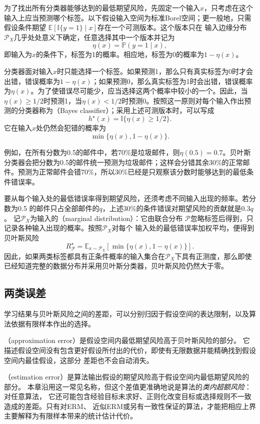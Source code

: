 为了找出所有分类器能够达到的最低期望风险，先固定一个输入$x$，只考虑在这个输入上应当预测哪个标签。以下假设输入空间为标准Borel空间；更一般地，只需假设条件期望
$\mathbb E[\mathbb I\{y=1\}\mid x]$存在一个可测版本。这个版本只在
输入边缘分布$\mathcal P_X$几乎处处意义下确定，任意选择其中一个版本并记为
\[
 \eta(x)=\mathbb P(y=1\mid x),
\]
即输入为$x$的条件下，标签为1的概率。相应地，标签为0的概率为$1-\eta(x)$。

分类器面对输入$x$时只能选择一个标签。如果预测1，那么只有真实标签为0时才会出错，错误概率为$1-\eta(x)$；如果预测0，那么真实标签为1时会出错，错误概率为$\eta(x)$。为了使错误尽可能少，应当选择这两个概率中较小的一个。因此，当$\eta(x)\geq1/2$时预测1，当$\eta(x)<1/2$时预测0。按照这一原则对每个输入作出预测的分类器称为（Bayes classifier）；采用上述可测版本时，可以写成
\[
 h^\star(x)=\mathbb I\{\eta(x)\geq1/2\}.
\]
它在输入$x$处仍然会犯错的概率为
\[
 \min\{\eta(x),1-\eta(x)\}.
\]

例如，在所有分数为0.5的邮件中，若70\%是垃圾邮件，则$\eta(0.5)=0.7$。贝叶斯分类器会把分数为0.5的邮件统一预测为垃圾邮件；这样会分错其余30\%的正常邮件。预测为正常邮件会错70\%，所以30\%已经是只观察该分数时能够达到的最低条件错误率。

要从每个输入处的最低错误率得到期望风险，还须考虑不同输入出现的频率。若分数为0.5
的邮件只占全部邮件的$q$，上述30\%的条件错误对期望风险的贡献就是$0.3q$。
记$\mathcal P_X$为输入的（marginal distribution）：它由联合分布
$\mathcal P$忽略标签后得到，只记录各种输入出现的概率。按照$\mathcal P_X$对每个
输入处的最低错误率加权平均，便得到贝叶斯风险
\[
 R_{\mathcal P}^\star=
 \mathbb E_{x\sim\mathcal P_X}[\min\{\eta(x),1-\eta(x)\}].
\]
因此，如果两类标签都具有正条件概率的输入集合在$\mathcal P_X$下具有正测度，那么即使
已经知道完整的数据分布并采用贝叶斯分类器，贝叶斯风险仍然大于零。

\subsection{两类误差}

学习结果与贝叶斯风险之间的差距，可以分别归因于假设空间的表达限制，以及算法依据有限样本作出的选择。

（approximation error）是假设空间内最低期望风险高于贝叶斯风险的部分。
它描述假设空间没有包含更好假设所付出的代价，即使有无限数据并能精确找到假设空间内最佳假设，这部分
差距也不会自动消失。

（estimation error）是算法输出假设的期望风险高于假设空间内最低期望风险的部分。
本章沿用这一常见名称，但这个差值更准确地说是算法的\emph{类内超额风险}：对任意算法，
它还可能包含经验目标未求好、正则化改变目标或选择规则不一致造成的差距。只有对ERM、
近似ERM或另有一致性保证的算法，才能把相应上界主要解释为有限样本带来的统计估计代价。


